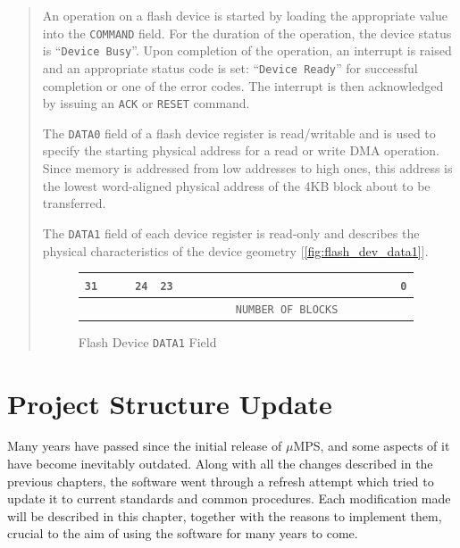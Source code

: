 \documentclass[12pt,a4paper,openright,twoside]{report}
\begin{document}
\begin{quote}
	An operation on a flash device is started by loading the appropriate value into the \texttt{COMMAND} field.
	For the duration of the operation, the device status is ``\texttt{Device Busy}''.
	Upon completion of the operation, an interrupt is raised and an appropriate status code is set: ``\texttt{Device Ready}'' for successful completion or one of the error codes.
	The interrupt is then acknowledged by issuing an \texttt{ACK} or \texttt{RESET} command.

	The \texttt{DATA0} field of a flash device register is read/writable and is used to specify the starting physical address for a read or write DMA operation.
	Since memory is addressed from low addresses to high ones, this address is the lowest word-aligned physical address of the 4KB block about to be transferred.

	The \texttt{DATA1} field of each device register is read-only and describes the physical characteristics of the device geometry [\autoref{fig:flash_dev_data1}].
	\begin{figure}[h]
		\centering
		\begin{tabularx}{\textwidth}{XXXXXXXXXXXXXXXX}
			\texttt{31}                           &                  &                  & \multicolumn{1}{r}{\texttt{24}}       & \texttt{23} &  &  &  &  &                                               &  &  &  &  &                       & \multicolumn{1}{r}{\texttt{0}} \\ \hline
			\multicolumn{1}{|l}{\cellcolor{gray}} & \cellcolor{gray} & \cellcolor{gray} & \multicolumn{1}{l|}{\cellcolor{gray}} &             &  &  &  &  & \multicolumn{2}{l}{\texttt{NUMBER OF BLOCKS}} &  &  &  &  & \multicolumn{1}{l|}{}                                  \\ \hline
		\end{tabularx}
		\caption{Flash Device \texttt{DATA1} Field}
		\label{fig:flash_dev_data1}
	\end{figure}
\end{quote}

\chapter{Project Structure Update}
\lhead[\fancyplain{}{\bfseries\thepage}]{\fancyplain{}{\bfseries\rightmark}}
Many years have passed since the initial release of $\mu$MPS, and some aspects of it have become inevitably outdated.
Along with all the changes described in the previous chapters, the software went through a refresh attempt which tried to update it to current standards and common procedures.
Each modification made will be described in this chapter, together with the reasons to implement them, crucial to the aim of using the software for many years to come.
\end{document}
